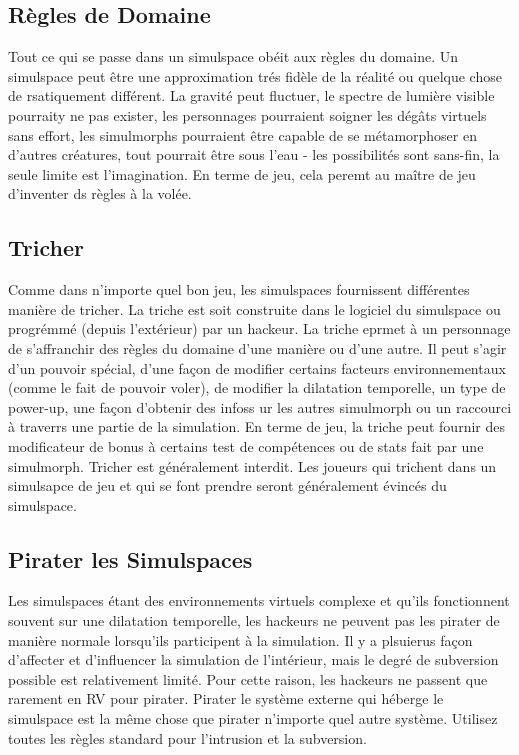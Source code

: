 \subsection{Règles de Domaine} 

Tout ce qui se passe dans un simulspace obéit aux règles du domaine. Un simulspace peut être une approximation trés fidèle de la réalité ou quelque chose de rsatiquement différent. La gravité peut fluctuer, le spectre de lumière visible pourraity ne pas exister, les personnages pourraient soigner les dégâts virtuels sans effort, les simulmorphs pourraient être capable de se métamorphoser en d'autres créatures, tout pourrait être sous l'eau - les possibilités sont sans-fin, la seule limite est l'imagination. En terme de jeu, cela peremt au maître de jeu d'inventer ds règles à la volée. 

\subsection{Tricher} 

Comme dans n'importe quel bon jeu, les simulspaces fournissent différentes manière de tricher. La triche est soit construite dans le logiciel du simulspace ou progrémmé (depuis l'extérieur) par un hackeur. La triche eprmet à un personnage de s'affranchir des règles du domaine d'une manière ou d'une autre. Il peut s'agir d'un pouvoir spécial, d'une façon de modifier certains facteurs environnementaux (comme le fait de pouvoir voler), de modifier la dilatation temporelle, un type de power-up, une façon d'obtenir des infoss ur les autres simulmorph ou un raccourci à traverrs une partie de la simulation. En terme de jeu, la triche peut fournir des modificateur de bonus à certains test de compétences ou de stats fait par une simulmorph. Tricher est généralement interdit. Les joueurs qui trichent dans un simulsapce de jeu et qui se font prendre seront généralement évincés du simulspace. 

\subsection{Pirater les Simulspaces} 

Les simulspaces étant des environnements virtuels complexe et qu'ils fonctionnent souvent sur une dilatation temporelle, les hackeurs ne peuvent pas les pirater de manière normale lorsqu'ils participent à la simulation. Il y a plsuierus façon d'affecter et d'influencer la simulation de l'intérieur, mais le degré de subversion possible est relativement limité. Pour cette raison, les hackeurs ne passent que rarement en RV pour pirater. Pirater le système externe qui héberge le simulspace est la même chose que pirater n'importe quel autre système. Utilisez toutes les règles standard pour l'intrusion et la subversion. 

